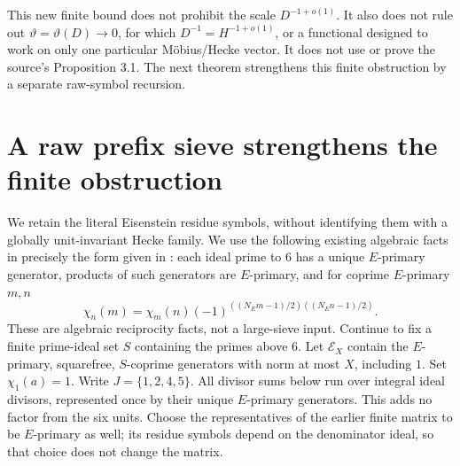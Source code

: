 \documentclass[11pt]{article}
\theoremstyle{remark}\newtheorem{remark}[theorem]{Remark}
\begin{document}
This new finite bound does not prohibit the scale $D^{-1+o(1)}$.
It also does not rule out $\vartheta=\vartheta(D)\to0$, for which
$D^{-1}=H^{-1+o(1)}$, or a functional designed to work on only
one particular M\"obius/Hecke vector. It does not use or prove
the source's Proposition 3.1. The next theorem strengthens this
finite obstruction by a separate raw-symbol recursion.

\section{A raw prefix sieve strengthens the finite obstruction}
We retain the literal Eisenstein residue symbols, without identifying
them with a globally unit-invariant Hecke family.
We use the following existing algebraic facts in precisely the form
given in \cite[\S2.1, PDF p.~3]{GaoZhao}: each ideal prime to $6$ has a
unique $E$-primary generator, products of such generators are
$E$-primary, and for coprime $E$-primary $m,n$
\[
 \chi_n(m)=\chi_m(n)
 (-1)^{((N_Em-1)/2)((N_En-1)/2)}.                 \tag{R}
\]
These are algebraic reciprocity facts, not a large-sieve input.
Continue to fix a finite prime-ideal set $S$ containing the primes
above $6$. Let $\mathcal E_X$ contain the $E$-primary, squarefree,
$S$-coprime generators with norm at most $X$, including $1$.
Set $\chi_1(a)=1$. Write $J=\{1,2,4,5\}$.
All divisor sums below run over integral ideal divisors, represented
once by their unique $E$-primary generators. This adds no factor
from the six units. Choose the representatives of the earlier
finite matrix to be $E$-primary as well; its residue symbols depend
on the denominator ideal, so that choice does not change the matrix.
\end{document}

